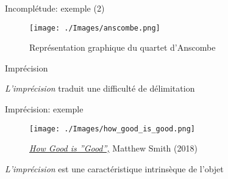 \documentclass{beamer}
\begin{document}
\begin{frame}{Incomplétude: exemple (2)}
	\begin{figure}
		\centering
		\texttt{[image: ./Images/anscombe.png]}
		\caption{Représentation graphique du quartet d'Anscombe}
	\end{figure}
\end{frame}

\begin{frame}{Imprécision}
	\begin{overprint}	
	\alert{\emph{L'imprécision}} traduit une difficulté de délimitation 
	\end{overprint}
\end{frame}


\begin{frame}{Imprécision: exemple}
	\begin{figure}
		\centering
		\texttt{[image: ./Images/how\_good\_is\_good.png]}
		\caption{\href{https://yougov.co.uk/news/2018/10/02/how-good-good/}{\emph{How Good is ''Good'',}} Matthew Smith (2018)}
	\end{figure}
\alert{\emph{L'imprécision}} est une caractéristique \alert{intrinsèque} de l'objet
\end{frame}
\end{document}
